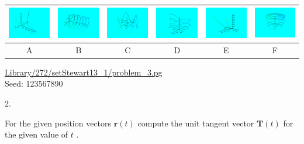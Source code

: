 \documentclass[10pt,]{book}
\theoremstyle{plain}
\theoremstyle{definition}
\theoremstyle{definition}
\theoremstyle{definition}
\theoremstyle{definition}
\theoremstyle{definition}
\numberwithin{equation}{section}
\begin{document}
\begin{exerciselist}
\begin{mdframed}
{     
\par\smallskip\begin{center}\begin{tabular}{|c|c|c|c|c|c|} \hline
\includegraphics[width=0.2\linewidth]{webwork-tex/webwork-64-image-1.png}
&\includegraphics[width=0.2\linewidth]{webwork-tex/webwork-64-image-2.png}
&\includegraphics[width=0.2\linewidth]{webwork-tex/webwork-64-image-3.png}
&\includegraphics[width=0.2\linewidth]{webwork-tex/webwork-64-image-4.png}
&\includegraphics[width=0.2\linewidth]{webwork-tex/webwork-64-image-5.png}
&\includegraphics[width=0.2\linewidth]{webwork-tex/webwork-64-image-6.png}
\\ \hline 
 A 
& B 
& C 
& D 
& E 
& F 
\\ \hline 
\end {tabular}\end{center}\par\smallskip



}\par\vspace*{2ex}%
{\tiny\ttfamily\noindent\url{Library/272/setStewart13_1/problem_3.pg}\\Seed: 123567890\hfill}\end{mdframed}
\item[2.]\hypertarget{exercise-65}{}\mbox{}\\ %
\begin{mdframed}
{
\par 
For the given position vectors \(\mathbf{r}(t)\) compute the unit tangent  
vector \(\mathbf{T}(t)\) for the given value of \(t\) . 
\par 

}
\end{mdframed}
\end{exerciselist}
\end{document}
